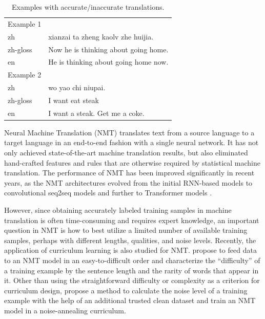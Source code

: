 \documentclass[letterpaper]{article}
\begin{document}
\begin{table}[tb]
  \label{tab:sample}
  \centering
  \begin{tabular}{ll}
    \toprule
    Example 1 & \\
    zh & xianzai ta zheng kaolv zhe huijia.\\
    zh-gloss & Now he is thinking about going home.\\
    en & He is thinking about going home now.\\
    \midrule
    Example 2 & \\
    zh & wo yao chi niupai.\\
    zh-gloss & I want eat steak\\
    en & I want a steak. Get me a coke.\\
    \bottomrule
  \end{tabular}
  \caption{Examples with accurate/inaccurate translations.}
\end{table}

Neural Machine Translation \cite{kalchbrenner2013recurrent} \cite{sutskever2014sequence} (NMT) translates text from a source language to a target language in an end-to-end fashion with a single neural network. It has not only achieved state-of-the-art machine translation results, but also eliminated hand-crafted features and rules that are otherwise required by statistical machine translation. The performance of NMT has been improved significantly in recent years, as the NMT architectures evolved from the initial RNN-based models \cite{sutskever2014sequence} to convolutional seq2seq models \cite{gehring2017convolutional} and further to Transformer models \cite{vaswani2017attention}.

However, since obtaining accurately labeled training samples in machine translation is often time-consuming and requires expert knowledge, an important question in NMT is how to best utilize a limited number of available training samples, perhaps with different lengths, qualities, and noise levels.
Recently, the application of curriculum learning is also studied for NMT. \cite{platanios2019competence} propose to feed data to an NMT model in an easy-to-difficult order and characterize the ``difficulty'' of a training example by the sentence length and the rarity of words that appear in it. Other than using the straightforward difficulty or complexity as a criterion for curriculum design, \cite{wang2018denoising} propose a method to calculate the noise level of a training example with the help of an additional trusted clean dataset and train an NMT model in a noise-annealing curriculum.
\end{document}
